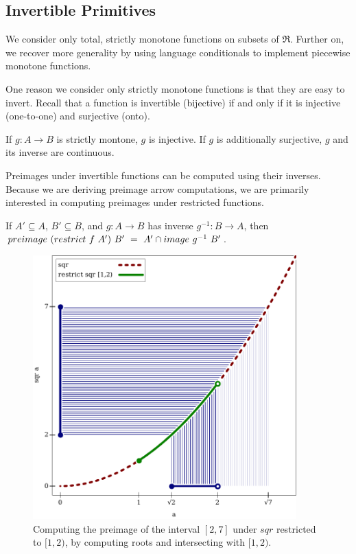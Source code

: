\subsection{Invertible Primitives}

We consider only total, strictly monotone functions on subsets of $\Re$.
Further on, we recover more generality by using language conditionals to implement piecewise monotone functions.

One reason we consider only strictly monotone functions is that they are easy to invert.
Recall that a function is invertible (bijective) if and only if it is injective (one-to-one) and surjective (onto).

\begin{lemma}
\label{lem:monotone-implies-invertible}
If $g : A \to B$ is strictly montone, $g$ is injective.
If $g$ is additionally surjective, $g$ and its inverse are continuous.
\end{lemma}

Preimages under invertible functions can be computed using their inverses.
Because we are deriving preimage arrow computations, we are primarily interested in computing preimages under restricted functions.

\begin{lemma}
\label{lem:invertible-function-preimages}
If $A' \subseteq A$, $B' \subseteq B$, and $g : A \to B$ has inverse $g^{-1} : B \to A$, then $preimage~(restrict~f~A')~B'\ =\ A' \cap image~g^{-1}~B'$.
\end{lemma}

\begin{figure}[!tb]
\centering
\includegraphics[width=4in]{figures/preimage-by-inverse-image}
\caption[{Computing the preimage of $[2,7]$}]{Computing the preimage of the interval $[2,7]$ under $sqr$ restricted to $[1,2)$, by computing roots and intersecting with $[1,2)$.}
\label{fig:sqr-preimage}
\end{figure}

